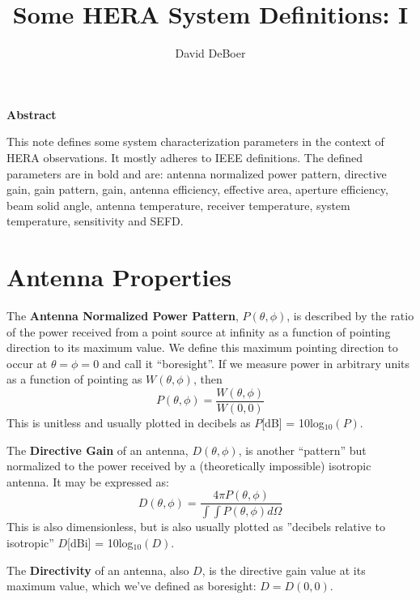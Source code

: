 \documentclass[11pt]{article}
\begin{document}
\title{Some HERA System Definitions: I}
\author{David DeBoer}
\maketitle

\begin{center}
{\bf Abstract}
\end{center}

\small
\begin{adjustwidth}{1in}{1in}
This note defines some system characterization parameters in the context of HERA observations.  It mostly adheres to IEEE definitions.  The defined parameters are in bold and are: antenna normalized power pattern, directive gain, gain pattern, gain, antenna efficiency, effective area, aperture efficiency, beam solid angle, antenna temperature, receiver temperature, system temperature, sensitivity and SEFD.
\end{adjustwidth}

\section{Antenna Properties}
The {\bf Antenna Normalized Power Pattern}, $P(\theta,\phi)$, is described by the ratio of the power received from a point source at infinity as a function of pointing direction to its maximum value.  We define this maximum pointing direction to occur at $\theta = \phi = 0$ and call it ``boresight''.  If we measure power in arbitrary units as a function of pointing as $W(\theta,\phi)$, then
\begin{equation}
P(\theta,\phi) = \frac{W(\theta,\phi)}{W(0,0)}
\end{equation}
This is unitless and usually plotted in decibels as $P$[dB] = 10log$_{10}(P)$.

The {\bf Directive Gain} of an antenna, $D(\theta,\phi)$, is another ``pattern'' but normalized to the power received by a (theoretically impossible) isotropic antenna.  It may be expressed as:
\begin{equation}
D(\theta,\phi) = \frac{4\pi P(\theta,\phi)}{\int\int P(\theta,\phi)d\Omega}
\end{equation} 
This is also dimensionless, but is also usually plotted as ''decibels relative to isotropic'' $D$[dBi] = 10log$_{10}(D)$.

The {\bf Directivity} of an antenna, also $D$, is the directive gain value at its maximum value, which we've defined as boresight:  $D = D(0,0)$.
\end{document}
